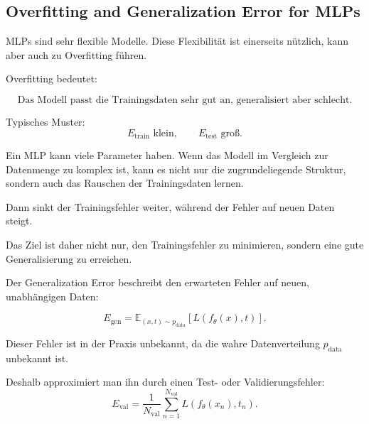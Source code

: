 \documentclass[11pt,a4paper]{scrartcl}
\begin{document}
\subsection{Overfitting and Generalization Error for MLPs}

\begin{notebox}
    MLPs sind sehr flexible Modelle. Diese Flexibilität ist einerseits nützlich,
    kann aber auch zu Overfitting führen.

    Overfitting bedeutet:

    \[
        \text{Das Modell passt die Trainingsdaten sehr gut an, generalisiert aber schlecht.}
    \]

    Typisches Muster:
    \[
        E_{\mathrm{train}} \text{ klein},
        \qquad
        E_{\mathrm{test}} \text{ groß}.
    \]
\end{notebox}

\begin{solutionbox}
    Ein MLP kann viele Parameter haben. Wenn das Modell im Vergleich zur
    Datenmenge zu komplex ist, kann es nicht nur die zugrundeliegende Struktur,
    sondern auch das Rauschen der Trainingsdaten lernen.

    Dann sinkt der Trainingsfehler weiter, während der Fehler auf neuen Daten
    steigt.

    Das Ziel ist daher nicht nur, den Trainingsfehler zu minimieren, sondern
    eine gute Generalisierung zu erreichen.
\end{solutionbox}

\begin{calculationbox}
    Der Generalization Error beschreibt den erwarteten Fehler auf neuen,
    unabhängigen Daten:

    \[
        E_{\mathrm{gen}}
        =
        \mathbb{E}_{(x,t)\sim p_{\mathrm{data}}}
        \left[
            L(f_\theta(x),t)
        \right].
    \]

    Dieser Fehler ist in der Praxis unbekannt, da die wahre Datenverteilung
    \(p_{\mathrm{data}}\) unbekannt ist.

    Deshalb approximiert man ihn durch einen Test- oder Validierungsfehler:
    \[
        E_{\mathrm{val}}
        =
        \frac{1}{N_{\mathrm{val}}}
        \sum_{n=1}^{N_{\mathrm{val}}}
        L(f_\theta(x_n),t_n).
    \]
\end{calculationbox}
\end{document}
